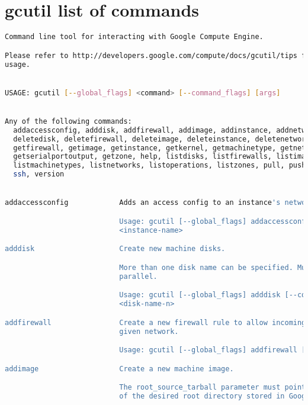 \section{gcutil list of commands}
  \begin{lstlisting}[language=Bash]
Command line tool for interacting with Google Compute Engine.

Please refer to http://developers.google.com/compute/docs/gcutil/tips for more information about gcutil
usage.


USAGE: gcutil [--global_flags] <command> [--command_flags] [args]


Any of the following commands:
  addaccessconfig, adddisk, addfirewall, addimage, addinstance, addnetwork, auth, deleteaccessconfig,
  deletedisk, deletefirewall, deleteimage, deleteinstance, deletenetwork, deleteoperation, getdisk,
  getfirewall, getimage, getinstance, getkernel, getmachinetype, getnetwork, getoperation, getproject,
  getserialportoutput, getzone, help, listdisks, listfirewalls, listimages, listinstances, listkernels,
  listmachinetypes, listnetworks, listoperations, listzones, pull, push, setcommoninstancemetadata,
  ssh, version


addaccessconfig            Adds an access config to an instance's network interface.

                           Usage: gcutil [--global_flags] addaccessconfig [--command_flags]
                           <instance-name>

adddisk                    Create new machine disks.

                           More than one disk name can be specified. Multiple disks will be created in
                           parallel.

                           Usage: gcutil [--global_flags] adddisk [--command_flags] <disk-name-1> ...
                           <disk-name-n>

addfirewall                Create a new firewall rule to allow incoming traffic for instances on a
                           given network.

                           Usage: gcutil [--global_flags] addfirewall [--command_flags] <firewall-name>

addimage                   Create a new machine image.

                           The root_source_tarball parameter must point to a tar file of the contents
                           of the desired root directory stored in Google Storage.


\end{lstlisting}
